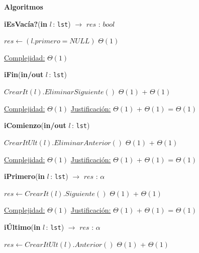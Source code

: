 \documentclass[a4paper,10pt]{article}
\let\TipoVariable=\texttt
\let\ModificadorArgumento=\textbf
\newcommand{\In}[2]{\ModificadorArgumento{in} \ensuremath{#1}\,: \TipoVariable{#2}\xspace}
\newcommand{\Inout}[2]{\ModificadorArgumento{in/out} \ensuremath{#1}\,: \TipoVariable{#2}\xspace}
\newenvironment{Algoritmos}{%
  \vspace*{2ex}%
  \noindent\textbf{\Large Algoritmos}%
  \vspace*{2ex}%
}{}
\begin{document}
\begin{Algoritmos}
\begin{algorithm}[H]{\textbf{iEsVacía?}(\In{l}{lst}) $\to$ $res$ : $bool$}
	\begin{algorithmic}[1]
			 \State $res \gets (l.primero = NULL)$	 \Comment $\Theta(1)$
    
			\medskip
			\Statex \underline{Complejidad:} $\Theta(1)$
    	\end{algorithmic}
\end{algorithm}	


\begin{algorithm}[H]{\textbf{iFin}(\Inout{l}{lst})}
	\begin{algorithmic}[1]
			 \State $CrearIt(l).EliminarSiguiente()$	\Comment $\Theta(1)$ + $\Theta(1)$
			 
			\medskip
			\Statex \underline{Complejidad:} $\Theta(1)$
			\Statex \underline{Justificación:} $\Theta(1)$ + $\Theta(1)$ = $\Theta(1)$
    	\end{algorithmic}
\end{algorithm}	

	
\begin{algorithm}[H]{\textbf{iComienzo}(\Inout{l}{lst})}	
	\begin{algorithmic}[1]
			 \State $CrearItUlt(l).EliminarAnterior()$	\Comment $\Theta(1)$ + $\Theta(1)$
    	    
			\medskip
			\Statex \underline{Complejidad:} $\Theta(1)$
			\Statex \underline{Justificación:} $\Theta(1)$ + $\Theta(1)$ = $\Theta(1)$
			 
    	\end{algorithmic}
\end{algorithm}	
	
\begin{algorithm}[H]{\textbf{iPrimero}(\In{l}{lst}) $\to$ $res$ : $\alpha$}	
	\begin{algorithmic}[1]
		 \State $res \gets CrearIt(l).Siguiente()$	\Comment $\Theta(1)$ + $\Theta(1)$

		\medskip
		\Statex \underline{Complejidad:} $\Theta(1)$
		\Statex \underline{Justificación:} $\Theta(1)$ + $\Theta(1)$ = $\Theta(1)$
    \end{algorithmic}
\end{algorithm}	
	
\begin{algorithm}[H]{\textbf{iÚltimo}(\In{l}{lst}) $\to$ $res$ : $\alpha$}	
	\begin{algorithmic}[1]
			 \State $res \gets CrearItUlt(l).Anterior()$	\Comment $\Theta(1)$ + $\Theta(1)$
    	    	    

\end{algorithmic}
\end{algorithm}
\end{Algoritmos}
\end{document}
